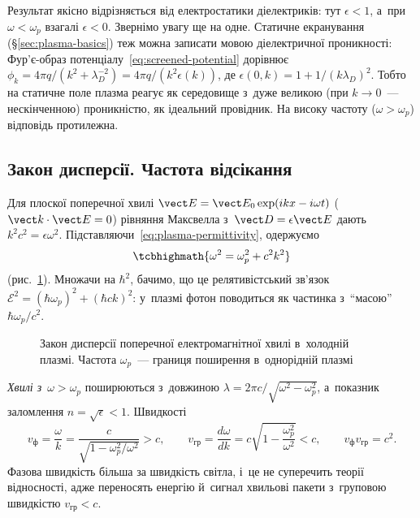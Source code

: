 Результат якісно відрізняється від електростатики діелектриків: тут $\epsilon<1$, а~при
$\omega<\omega_p$ взагалі $\epsilon<0$. Звернімо увагу ще на одне. Статичне екранування
(§\ref{sec:plasma-basics}) теж можна записати мовою діелектричної проникності: Фур'є-образ
потенціалу~\eqref{eq:screened-potential} дорівнює $\phi_k=4\pi
	q/(k^2+\lambda_D^{-2})=4\pi q/(k^2\epsilon(k))$, де
$\epsilon(0,k)=1+1/(k\lambda_D)^2$. Тобто на статичне поле плазма реагує як середовище
з~дуже великою (при $k\to0$~--- нескінченною) проникністю, як ідеальний провідник. На
високу частоту ($\omega>\omega_p$) відповідь протилежна.


\subsection*{Закон дисперсії. Частота відсікання}


Для плоскої поперечної хвилі $\vect E=\vect E_0\exp(ikx-i\omega t)$ ($\vect k\cdot\vect
	E=0$) рівняння Максвелла з~$\vect D=\epsilon\vect E$ дають
$k^2c^2=\epsilon\omega^2$. Підставляючи~\eqref{eq:plasma-permittivity}, одержуємо
\begin{equation}\label{eq:plasma-dispersion}
	\tcbhighmath{\omega^2=\omega_p^2+c^2k^2}
\end{equation}
(рис.~\ref{pic:plasma-dispersion}). Множачи на $\hbar^2$, бачимо, що це релятивістський
зв'язок $\mathcal E^2=(\hbar\omega_p)^2+(\hbar ck)^2$: у~плазмі фотон поводиться як
частинка з~\enquote{масою} $\hbar\omega_p/c^2$.

\begin{figure}[h!]\centering
	\caption{Закон дисперсії поперечної електромагнітної хвилі в~холодній плазмі. Частота
		$\omega_p$~--- границя поширення в~однорідній плазмі}
	\label{pic:plasma-dispersion}
\end{figure}

\emph{Хвилі з~$\omega>\omega_p$} поширюються з~довжиною $\lambda=2\pi
	c/\sqrt{\omega^2-\omega_p^2}$, а~показник заломлення $n=\sqrt\epsilon<1$. Швидкості
\begin{equation*}
	v_{\mathrm{ф}}=\frac\omega k=\frac c{\sqrt{1-\omega_p^2/\omega^2}}>c,\qquad
	v_{\mathrm{гр}}=\frac{d\omega}{dk}=c\sqrt{1-\frac{\omega_p^2}{\omega^2}}<c,\qquad
	v_{\mathrm{ф}}v_{\mathrm{гр}}=c^2.
\end{equation*}
Фазова швидкість більша за швидкість світла, і~це не суперечить теорії відносності, адже
переносять енергію й~сигнал хвильові пакети з~груповою швидкістю $v_{\mathrm{гр}}<c$.

